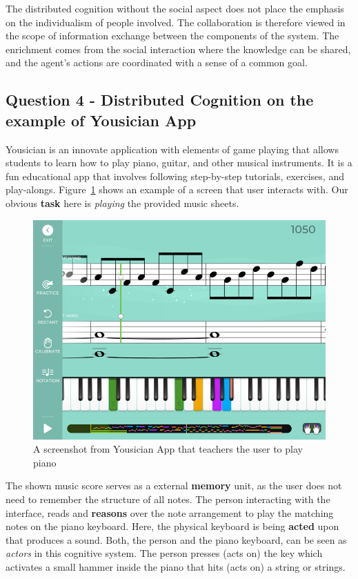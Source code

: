 \documentclass[12pt,letterpaper]{article}
\begin{document}
The distributed cognition without the social aspect does not place the emphasis on the individualism of people involved. The collaboration is therefore viewed in the scope of information exchange between the components of the system. The enrichment comes from the social interaction where the knowledge can be shared, and the agent's actions are coordinated with a sense of a common goal. 


\subsection*{Question 4 - Distributed Cognition on the example of Yousician App}

Yousician is an innovate application with elements of game playing that allows students to learn how to play piano, guitar, and other musical instruments\cite{eli2017yousician}. It is a fun educational app that involves following step-by-step tutorials, exercises, and play-alongs. Figure~\ref{fig::2} shows an example of a screen that user interacts with. Our obvious \textbf{task} here is \textit{playing} the provided music sheets.

\begin{figure}[h]
\centering
\includegraphics[scale=.35]{figures/p3/yousician.png}
\caption{A screenshot from Yousician App that teachers the user to play piano}
\label{fig::2}
\end{figure}

The shown music score serves as a external \textbf{memory} unit, as the user does not need to remember the structure of all notes. The person interacting with the interface, reads and \textbf{reasons} over the note arrangement to play the matching notes on the piano keyboard. Here, the physical keyboard is being \textbf{acted} upon that produces a sound. Both, the person and the piano keyboard, can be seen as \textit{actors} in this cognitive system. The person presses (acts on) the key which activates a small hammer inside the piano that hits (acts on) a string or strings. 
\end{document}
